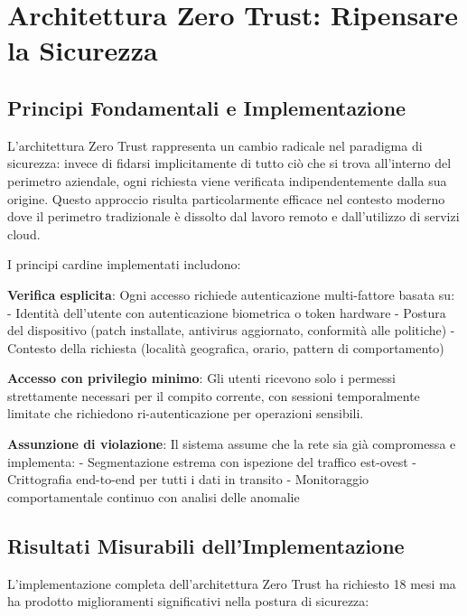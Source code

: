 \section{\texorpdfstring{Architettura Zero Trust: Ripensare la Sicurezza}{3.5 - Architettura Zero Trust: Ripensare la Sicurezza}}

\subsection{\texorpdfstring{Principi Fondamentali e Implementazione}{3.5.1 - Principi Fondamentali e Implementazione}}

L'architettura Zero Trust rappresenta un cambio radicale nel paradigma di sicurezza: invece di fidarsi implicitamente di tutto ciò che si trova all'interno del perimetro aziendale, ogni richiesta viene verificata indipendentemente dalla sua origine. Questo approccio risulta particolarmente efficace nel contesto moderno dove il perimetro tradizionale è dissolto dal lavoro remoto e dall'utilizzo di servizi cloud.

I principi cardine implementati includono:

\textbf{Verifica esplicita}: Ogni accesso richiede autenticazione multi-fattore basata su:
- Identità dell'utente con autenticazione biometrica o token hardware
- Postura del dispositivo (patch installate, antivirus aggiornato, conformità alle politiche)
- Contesto della richiesta (località geografica, orario, pattern di comportamento)

\textbf{Accesso con privilegio minimo}: Gli utenti ricevono solo i permessi strettamente necessari per il compito corrente, con sessioni temporalmente limitate che richiedono ri-autenticazione per operazioni sensibili.

\textbf{Assunzione di violazione}: Il sistema assume che la rete sia già compromessa e implementa:
- Segmentazione estrema con ispezione del traffico est-ovest
- Crittografia end-to-end per tutti i dati in transito
- Monitoraggio comportamentale continuo con analisi delle anomalie

\subsection{\texorpdfstring{Risultati Misurabili dell'Implementazione}{3.5.2 - Risultati Misurabili dell'Implementazione}}

L'implementazione completa dell'architettura Zero Trust ha richiesto 18 mesi ma ha prodotto miglioramenti significativi nella postura di sicurezza:

